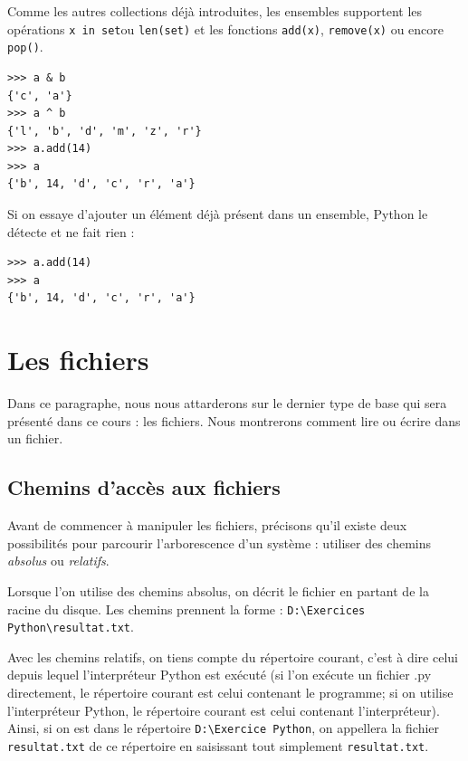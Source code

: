\documentclass[12pt, a4paper]{article}
\begin{document}
Comme les autres collections déjà introduites, les ensembles supportent les opérations \lstinline{x in set}ou \lstinline{len(set)} et les fonctions \lstinline{add(x)}, \lstinline{remove(x)} ou encore \lstinline{pop()}.
\begin{lstlisting}
>>> a & b 
{'c', 'a'}
>>> a ^ b
{'l', 'b', 'd', 'm', 'z', 'r'}
>>> a.add(14)
>>> a
{'b', 14, 'd', 'c', 'r', 'a'}
\end{lstlisting}

Si on essaye d'ajouter un élément déjà présent dans un ensemble, Python le détecte et ne fait rien :
\begin{lstlisting}
>>> a.add(14)
>>> a
{'b', 14, 'd', 'c', 'r', 'a'}
\end{lstlisting}



\section{Les fichiers}
\label{sec:fichiers}
Dans ce paragraphe, nous nous attarderons sur le dernier type de base qui sera présenté dans ce cours : les fichiers. Nous montrerons comment lire ou écrire dans un fichier.


\subsection{Chemins d'accès aux fichiers}
Avant de commencer à manipuler  les fichiers, précisons qu'il existe deux possibilités pour parcourir l'arborescence d'un système : utiliser des chemins \textit{absolus} ou \textit{relatifs}. 

Lorsque l'on utilise des chemins absolus, on décrit le fichier en partant de la racine du disque. Les chemins prennent la forme : \lstinline{D:\Exercices Python\resultat.txt}. 

Avec les chemins relatifs, on tiens compte du répertoire courant, c'est à dire celui depuis lequel l'interpréteur Python est exécuté (si l'on exécute un fichier .py directement, le répertoire courant est celui contenant le programme; si on utilise l'interpréteur Python, le répertoire courant est celui contenant l'interpréteur). Ainsi, si on est dans le répertoire \lstinline{D:\Exercice Python}, on appellera la fichier \lstinline{resultat.txt} de ce répertoire en saisissant tout simplement \lstinline{resultat.txt}.
\end{document}
